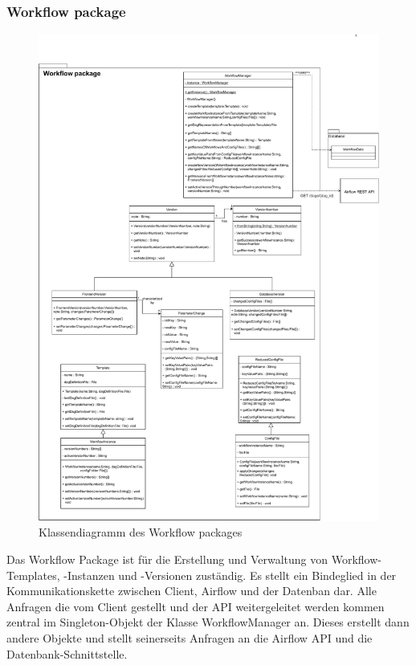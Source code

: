 \subsubsection{Workflow package}
\begin{figure}[H]
    \includegraphics[width=1\textwidth]{res/Klassen/wfPackage.pdf}
    \caption{Klassendiagramm des Workflow packages}
\end{figure}
Das Workflow Package ist für die Erstellung und Verwaltung von Workflow-Templates, -Instanzen und -Versionen zuständig.
Es stellt ein Bindeglied in der Kommunikationskette zwischen Client, Airflow und der Datenban dar.
Alle Anfragen die vom Client gestellt und der API weitergeleitet werden kommen zentral im Singleton-Objekt der Klasse WorkflowManager an.
Dieses erstellt dann andere Objekte und stellt seinerseits Anfragen an die Airflow API und die Datenbank-Schnittstelle.

